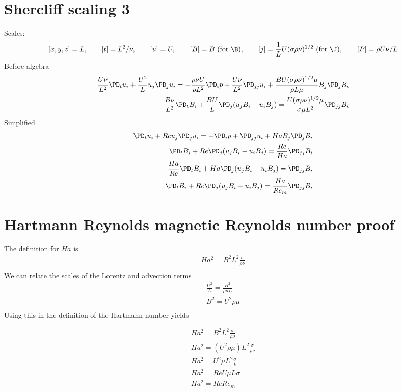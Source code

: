 \documentclass[11pt]{article}
\begin{document}
\section{Shercliff scaling 3}
Scales:
\begin{equation}\begin{aligned}
	[x,y,z] = L, \qquad
	[t] = L^2 / \nu, \qquad
	[u] = U, \qquad
	[B] = B \text{ (for $\B$)}, \qquad
	[j] = \frac{1}{L} U (\sigma \rho \nu)^{1/2} \text{ (for $\J$)}, \qquad
	[P] = \rho U \nu / L
\end{aligned} \end{equation}
Before algebra
\begin{equation}\begin{aligned}
\frac{U \nu}{L^2} \PD_t u_i+ \frac{U^2}{L} u_j\PD_j u_i =-\frac{\rho \nu U}{\rho L^2}\PD_i p+ \frac{U \nu}{L^2} \PD_{jj} u_i + \frac{B U (\sigma \rho \nu)^{1/2} \mu}{\rho L \mu} B_j \PD_j B_i \\
\frac{B \nu}{L^2} \PD_t B_i + \frac{B U}{L} \PD_j (u_j B_i - u_i B_j) = \frac{U (\sigma \rho \nu)^{1/2} \mu}{\sigma \mu L^2} \PD_{jj} B_i
\end{aligned} \end{equation}
Simplified
\begin{equation}\begin{aligned}
\PD_t u_i+ Re u_j\PD_j u_i =-\PD_i p+ \PD_{jj} u_i + Ha B_j \PD_j B_i \\
\PD_t B_i + Re \PD_j (u_j B_i - u_i B_j) = \frac{Re}{Ha} \PD_{jj} B_i \\
\frac{Ha}{Re} \PD_t B_i + Ha \PD_j (u_j B_i - u_i B_j) = \PD_{jj} B_i \\
\PD_t B_i + Re \PD_j (u_j B_i - u_i B_j) = \frac{Ha}{Re_m} \PD_{jj} B_i
\end{aligned} \end{equation}

\section{Hartmann Reynolds magnetic Reynolds number proof}
The definition for $Ha$ is
\begin{equation}\begin{aligned}
Ha^2 = B^2 L^2 \frac{\sigma}{\rho \nu} \\
\end{aligned} \end{equation}
We can relate the scales of the Lorentz and advection terms
\begin{equation}\begin{aligned}
\frac{U^2}{L} = \frac{B^2}{\rho \mu L} \\
B^2 = U^2 \rho \mu \\
\end{aligned} \end{equation}
Using this in the definition of the Hartmann number yields

\begin{equation}\begin{aligned}
Ha^2 = B^2 L^2 \frac{\sigma}{\rho \nu} \\
Ha^2 = (U^2 \rho \mu) L^2 \frac{\sigma}{\rho \nu} \\
Ha^2 = U^2 \mu L^2 \frac{\sigma}{\nu} \\
Ha^2 = Re U \mu L \sigma \\
Ha^2 = Re Re_m \\
\end{aligned} \end{equation}
\end{document}
